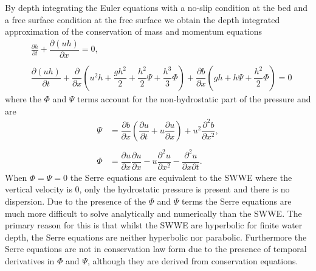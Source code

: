 By depth integrating the Euler equations \cite{Su-Gardener-1969-536,Zoppou-2014} with a no-slip condition at the bed and a free surface condition at the free surface we obtain the depth integrated approximation of the conservation of mass and momentum equations
\begin{subequations}
	\begin{align}
	&\frac{\partial h}{\partial t} + \dfrac{\partial (uh)}{\partial x} = 0,  \label{eqn:FullSerreNonConMass} \\ \nonumber \\
	&\dfrac{\partial (uh)}{\partial t} + \dfrac{\partial}{\partial x} \left ( u^2h + \dfrac{gh^2}{2} + \dfrac{h^2}{2}{\Psi} + \dfrac{h^3}{3}{ \Phi }  \right )  +  \dfrac{\partial b}{\partial x} \left (gh +   h \Psi + \dfrac{h^2}{2}{ \Phi }  \right ) = 0	\label{eqn:FullSerreNonConMome}
	\end{align}
	\label{eqn:FullSerreNonCon}
\end{subequations}
where the $\Phi$ and $\Psi$ terms account for the non-hydrostatic part of the pressure and are
	\begin{subequations}
	\begin{align}
	{ \Psi }  &= \dfrac{\partial b}{\partial x}\left(\dfrac{\partial u}{\partial t} + u\dfrac{\partial u}{\partial x} \right)  + u^2\dfrac{\partial^2 b}{\partial x^2}, \label{eqn:SerreeqnPsi} \\ \nonumber \\
 { \Phi }  &= \dfrac{\partial u }{\partial x} \dfrac{\partial u}{\partial x} -u \dfrac{\partial^2 u}{\partial x^2}  - \dfrac{\partial^2 u}{\partial x \partial t} . \label{eqn:SerreeqnPhi} 
	\end{align}
	\label{eqn:FullSerreNonConVarDef}
	\end{subequations}
When $\Phi = \Psi = 0$ the Serre equations are equivalent to the SWWE where the vertical velocity is $0$, only the hydrostatic pressure is present and there is no dispersion. Due to the presence of the $\Phi$ and $\Psi$ terms the Serre equations are much more difficult to solve analytically and numerically than the SWWE. The primary reason for this is that whilst the SWWE are hyperbolic for finite water depth, the Serre equations are neither hyperbolic nor parabolic. Furthermore the Serre equations are not in conservation law form due to the presence of temporal derivatives in $\Phi$ and $\Psi$, although they are derived from conservation equations. 

